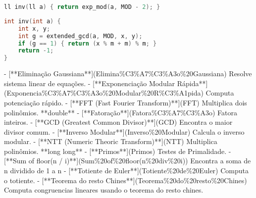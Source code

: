\documentclass[11pt, a4paper, twoside]{article}
\begin{document}
\begin{multicols}{2}
\begin{lstlisting}[language=C++]
ll inv(ll a) { return exp_mod(a, MOD - 2); }
\end{lstlisting}
\end{multicols}

\begin{multicols}{2}
\begin{lstlisting}[language=C++]
int inv(int a) {
    int x, y;
    int g = extended_gcd(a, MOD, x, y);
    if (g == 1) { return (x % m + m) % m; }
    return -1;
}
\end{lstlisting}
\end{multicols}



- [**Eliminação Gaussiana**](Elimina\%C3\%A7\%C3\%A3o\%20Gaussiana)  
Resolve sistema linear de equações.
- [**Exponenciação Modular Rápida**](Exponencia\%C3\%A7\%C3\%A3o\%20Modular\%20R\%C3\%A1pida)  
Computa potenciação rápido.
- [**FFT (Fast Fourier Transform)**](FFT)  
Multiplica dois polinômios. **double**
- [**Fatoração**](Fatora\%C3\%A7\%C3\%A3o)  
Fatora inteiros.
- [**GCD (Greatest Common Divisor)**](GCD)  
Encontra o maior divisor comum. 
- [**Inverso Modular**](Inverso\%20Modular)  
Calcula o inverso modular.
- [**NTT (Numeric Theoric Transform)**](NTT)  
Multiplica polinômios. **long long**
- [**Primos**](Primos)  
Testes de Primalidade.
- [**Sum of floor(n / i)**](Sum\%20of\%20floor(n\%20div\%20i))  
Encontra a soma de n dividido de 1 a n
- [**Totiente de Euler**](Totiente\%20de\%20Euler)  
Computa o totiente.
- [**Teorema do resto Chines**](Teorema\%20do\%20resto\%20Chines)  
Computa congruencias lineares usando o teorema do resto chines.
\end{document}
